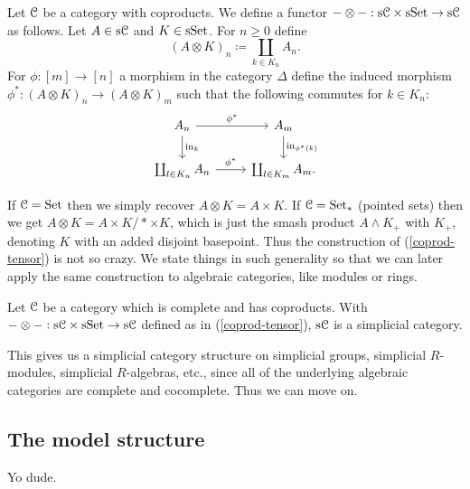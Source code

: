 \begin{nothing}
  \label{coprod-tensor}
  Let $\mathcal{C}$ be a category with coproducts. We define a functor $-
  \otimes - : \mathrm{s}\mathcal{C} \times \mathrm{s}\mathrm{Set} \to \mathrm{s}\mathcal{C}$ as follows. Let $A \in
  \mathrm{s}\mathcal{C}$ and $K \in \mathrm{s}\mathrm{Set}$. For $n \ge 0$ define
  \[
  (A \otimes K)_n \coloneqq \coprod_{k \in K_n} A_n.
  \]
  For $\phi : [m] \to [n]$ a morphism in the category $\Delta$ define
  the induced morphism $\phi^* : (A \otimes K)_n \to (A \otimes K)_m$
  such that the following commutes for $k \in K_n$:
  \[
  \begin{tikzcd}
    A_n \rar{\phi^*} \dar{\incl_k} & A_m \dar{\incl_{\phi^*(k)}}
    \\ \coprod_{l \in K_n} A_n \rar{\phi^*} &\coprod_{l \in K_m} A_m.
  \end{tikzcd}
  \]
\end{nothing}

\begin{examples}
  If $\mathcal{C} = \mathrm{Set}$ then we simply recover $A \otimes K = A \times K$. If
  $\mathcal{C} = \mathrm{Set}_*$ (pointed sets) then we get $A \otimes K = A \times K /
  * \times K$, which is just the smash product $A \wedge K_+$ with
  $K_+$, denoting $K$ with an added disjoint basepoint. Thus the
  construction of (\ref{coprod-tensor}) is not so crazy. We state
  things in such generality so that we can later apply the same
  construction to algebraic categories, like modules or rings.
\end{examples}

\begin{proposition}
  \label{coprod-simplcat}
  Let $\mathcal{C}$ be a category which is complete and has coproducts. With $-
  \otimes - : \mathrm{s}\mathcal{C} \times \mathrm{s}\mathrm{Set} \to \mathrm{s}\mathcal{C}$ defined as in
  (\ref{coprod-tensor}), $\mathrm{s}\mathcal{C}$ is a simplicial category.
\end{proposition}

This gives us a simplicial category structure on simplicial groups,
simplicial $R$-modules, simplicial $R$-algebras, etc., since all of
the underlying algebraic categories are complete and cocomplete. Thus
we can move on.


\subsection{The model structure}

Yo dude.


